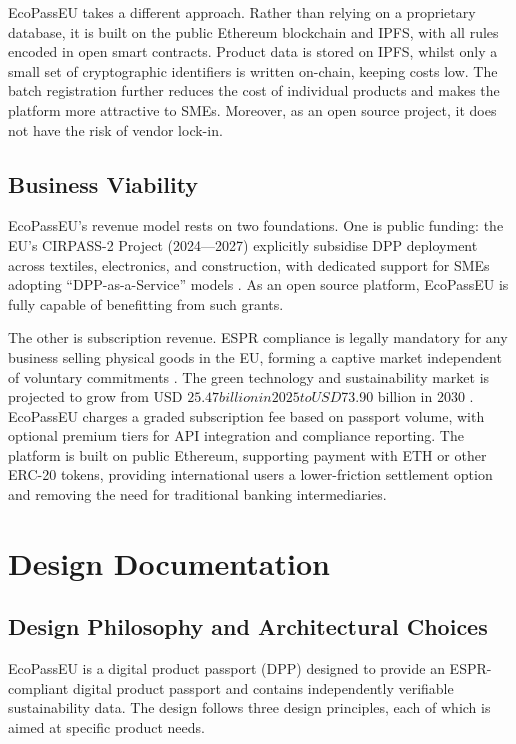 \documentclass[runningheads]{llncs}
\begin{document}
	EcoPassEU takes a different approach. 
	Rather than relying on a proprietary database, it is built on the public Ethereum blockchain and IPFS, with all rules encoded in open smart contracts. 
	Product data is stored on IPFS, whilst only a small set of cryptographic identifiers is written on-chain, keeping costs low. 
	The batch registration further reduces the cost of individual products and makes the platform more attractive to SMEs. Moreover, as an open source project, it does not have the risk of vendor lock-in.
	
	
	\subsection{Business Viability}
	EcoPassEU's revenue model rests on two foundations.
	One is public funding: the EU's CIRPASS-2 Project (2024—2027) explicitly subsidise DPP deployment across textiles, electronics, and construction, with dedicated support for SMEs adopting ``DPP-as-a-Service'' models \cite{cirpass2_2024}.
	As an open source platform, EcoPassEU is fully capable of benefitting from such grants.
	
	The other is subscription revenue. ESPR compliance is legally mandatory for any business selling physical goods in the EU, forming a captive market independent of voluntary commitments \cite{circularise_dpp_2025}.
	The green technology and sustainability market is projected to grow from USD $25.47 billion in 2025 to USD $73.90 billion in 2030 \cite{marketsandmarkets2025}. EcoPassEU charges a graded subscription fee based on passport volume, with optional premium tiers for API integration and compliance reporting. The platform is built on public Ethereum, supporting payment with ETH or other ERC-20 tokens, providing international users a lower-friction settlement option and removing the need for traditional banking intermediaries.
	
	
	
	
	
	\section{Design Documentation}
	\subsection{Design Philosophy and Architectural Choices}
	EcoPassEU is a digital product passport (DPP) designed to provide an ESPR-compliant digital product passport and contains independently verifiable sustainability data. The design follows three design principles, each of which is aimed at specific product needs. 
	
\end{document}
